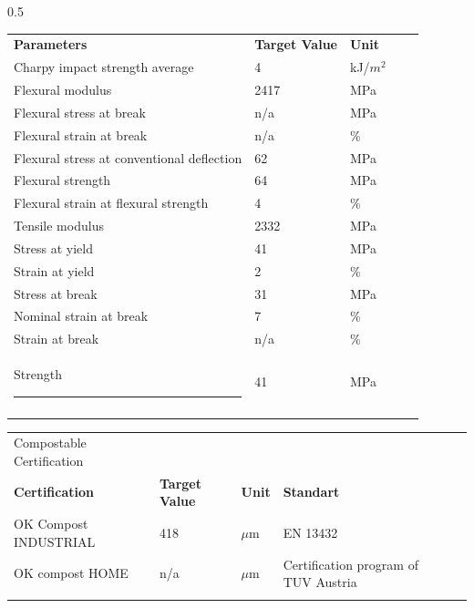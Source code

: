 \documentclass{article}
\begin{document}
\begin{center}
\begin{paracol}{2}
\begin{tabularx}{0.5\textwidth}
\end{tabularx}\switchcolumn\begin{tabularx}{0.5\textwidth}
{X l  l  l  l }\textbf{Parameters} & \textbf{Target Value} & \textbf{Unit} &  &  \\
Charpy impact strength average & 4 & kJ/\(m^2\) &  &  \\
\arrayrulecolor{line_color}\hline
Flexural modulus & 2417 & MPa &  &  \\
\arrayrulecolor{line_color}\hline
Flexural stress at break & n/a & MPa &  &  \\
\arrayrulecolor{line_color}\hline
Flexural strain at break & n/a & \% &  &  \\
\arrayrulecolor{line_color}\hline
Flexural stress at conventional deflection & 62 & MPa &  &  \\
\arrayrulecolor{line_color}\hline
Flexural strength & 64 & MPa &  &  \\
\arrayrulecolor{line_color}\hline
Flexural strain at flexural strength & 4 & \% &  &  \\
\arrayrulecolor{line_color}\hline
Tensile modulus & 2332 & MPa &  &  \\
\arrayrulecolor{line_color}\hline
Stress at yield & 41 & MPa &  &  \\
\arrayrulecolor{line_color}\hline
Strain at yield & 2 & \% &  &  \\
\arrayrulecolor{line_color}\hline
Stress at break & 31 & MPa &  &  \\
\arrayrulecolor{line_color}\hline
Nominal strain at break & 7 & \% &  &  \\
\arrayrulecolor{line_color}\hline
Strain at break & n/a & \% &  &  \\
\arrayrulecolor{line_color}\hline
Strength \rule{80pt}{0pt} & 41 & MPa &  &  \\
\arrayrulecolor{line_color}\hline

\end{tabularx}
\end{paracol}
\end{center}
\begin{center}
\begin{tabularx}
{\textwidth}{X l  l  l  l }\rowcolor{color_title}Compostable Certification &  &  &  &  \\
\textbf{Certification} & \textbf{Target Value} & \textbf{Unit} & \textbf{Standart} &  \\
OK Compost INDUSTRIAL & 418 & \(\mu\)m & EN 13432 &  \\
\arrayrulecolor{line_color}\hline
OK compost HOME & n/a & \(\mu\)m & Certification program of TUV Austria &  \\
\arrayrulecolor{line_color}\hline

\end{tabularx}
\end{center}
\end{document}
